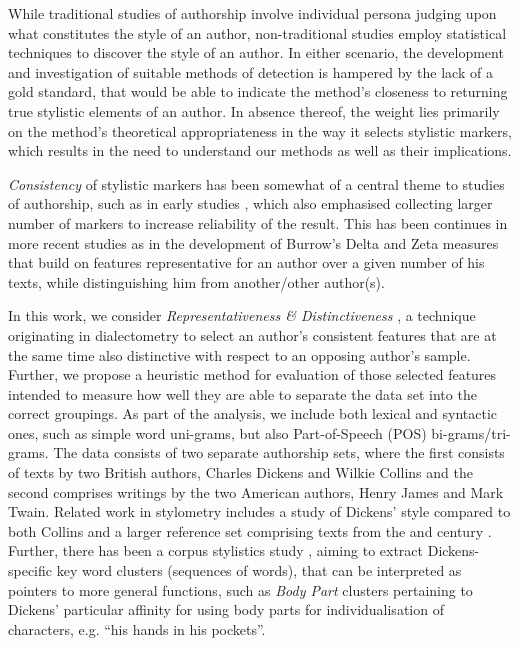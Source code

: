\documentclass[a4paper,10pt,twoside,fleqn]{article}
\begin{document}
While traditional studies of authorship involve individual persona
judging upon what constitutes the style of an author, non-traditional
studies employ statistical techniques to discover the style of
an author. 
In either scenario, the development and investigation of suitable
methods of detection is hampered by the lack of a gold standard,
that would be able to indicate the method's closeness to 
returning true stylistic elements of an author. 
In absence thereof, the weight lies primarily on the method's 
theoretical appropriateness in the way it selects stylistic 
markers, which results in the need to understand our methods 
as well as their implications. 

\emph{Consistency} of stylistic markers has been somewhat of 
a central theme to studies of authorship, such as in early 
studies \cite{Mosteller2008}, which also emphasised collecting
larger number of markers to increase reliability of the result.
This has been continues in more recent studies as in 
the development of Burrow's Delta \cite{Burrows2002delta} 
and Zeta \cite{Burrows2007all} measures that build on
features representative for an author over a given number
of his texts, while distinguishing him from another/other 
author(s).

In this work, we consider \emph{Representativeness \& Distinctiveness}
\cite{prokic2012detecting}, a technique originating in dialectometry 
to select an author’s consistent features that are at the same time
also distinctive with respect to an opposing author’s sample.
Further, we propose a heuristic method for evaluation of those
selected features intended to measure how well they are able to
separate the data set into the correct groupings. 
As part of the analysis, we include both lexical and syntactic ones, 
such as simple word uni-grams, but also Part-of-Speech (POS) 
bi-grams/tri-grams.
The data consists of two separate authorship sets, where the first
consists of texts by two British authors, Charles Dickens and
Wilkie Collins and the second comprises writings by the two
American authors, Henry James and Mark Twain. 
Related work in stylometry includes a study of Dickens' style
compared to both Collins and a larger reference set comprising
texts from the   and  century \cite{Tabata2012}.
Further, there has been a corpus stylistics study \cite{mahlberg2007clusters},
aiming to extract Dickens-specific key word clusters (sequences of words), 
that can be interpreted as pointers to more general functions, such
as \emph{Body Part} clusters pertaining to Dickens' particular affinity for using 
body parts for individualisation of characters, e.g. ``his hands in his pockets''. 
\end{document}
